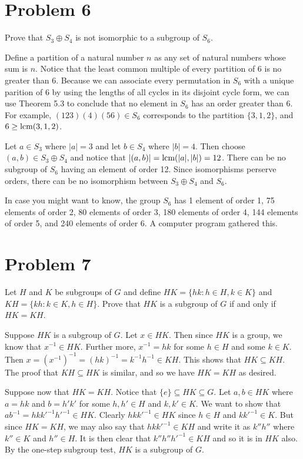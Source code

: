 \documentclass{article}
\begin{document}
\section*{Problem 6}

Prove that $S_3\oplus S_4$ is not isomorphic to a subgroup of $S_6$.

Define a partition of a natural number $n$ as any set of
natural numbers whose sum is $n$.  Notice that the least
common multiple of every partition of 6 is no greater than 6.
Because we can associate every permutation in $S_6$ with a unique
parition of 6 by using the lengths of all cycles in its disjoint
cycle form, we can use Theorem 5.3 to conclude that no element
in $S_6$ has an order greater than 6.  For example,
$(123)(4)(56)\in S_6$ corresponds to the partition $\{3,1,2\}$,
and $6\geq\mbox{lcm}(3,1,2)$.

Let $a\in S_3$ where $|a|=3$ and let $b\in S_4$ where $|b|=4$.
Then choose $(a,b)\in S_3\oplus S_4$ and notice that
$|(a,b)|=\mbox{lcm}(|a|,|b|)=12$.  There can be no subgroup of $S_6$ having
an element of order 12.  Since isomorphisms perserve orders, there
can be no isomorphism between $S_3\oplus S_4$ and $S_6$.

In case you might want to know,
the group $S_6$ has 1 element of order 1, 75 elements of order 2,
80 elements of order 3, 180 elements of order 4, 144 elements
of order 5, and 240 elements of order 6.  A computer program gathered this.

\section*{Problem 7}

Let $H$ and $K$ be subgroups of $G$ and define $HK=\{hk : h\in H, k\in K\}$ and
$KH=\{kh : k\in K, h\in H\}$.  Prove that $HK$ is a subgroup of $G$ if and only if
$HK=KH$.

Suppose $HK$ is a subgroup of $G$.  Let $x\in HK$.  Then since $HK$ is a group,
we know that $x^{-1}\in HK$.  Further more, $x^{-1} = hk$ for some $h\in H$ and
some $k\in K$.  Then $x = (x^{-1})^{-1} = (hk)^{-1} = k^{-1}h^{-1}\in KH$.
This shows that $HK\subseteq KH$.  The proof that $KH\subseteq HK$ is similar,
and so we have $HK=KH$ as desired.

Suppose now that $HK=KH$.  Notice that $\{e\}\subseteq HK\subseteq G$.
Let $a,b\in HK$ where $a=hk$ and $b=h'k'$
for some $h,h'\in H$ and $k,k'\in K$.  We want to show that
$ab^{-1}=hkk'^{-1}h'^{-1}\in HK$.  Clearly $hkk'^{-1}\in HK$ since
$h\in H$ and $kk'^{-1}\in K$.  But since $HK=KH$, we may also say
that $hkk'^{-1}\in KH$ and write it as $k''h''$ where $k''\in K$
and $h''\in H$.  It is then clear that $k''h''h'^{-1}\in KH$ and
so it is in $HK$ also.  By the one-step subgroup test, $HK$ is
a subgroup of $G$.
\end{document}
